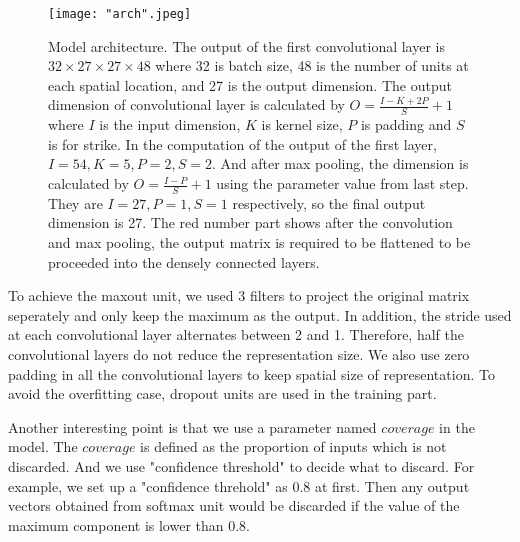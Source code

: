 \documentclass[conference]{IEEEtran}
\begin{document}
\begin{figure}[h]
\centering
\texttt{[image: "arch".jpeg]}
\caption{Model architecture. The output of the first convolutional layer is $32\times27\times27\times48$ where 32 is batch size, 48 is the number of units at each spatial location, and 27 is the output dimension. The output dimension of convolutional layer is calculated by $O=\frac{I-K+2P}{S}+1$ where $I$ is the input dimension, $K$ is kernel size, $P$ is padding and $S$ is for strike. In the computation of the output of the first layer, $I=54, K=5, P=2, S=2$. And after max pooling, the dimension is calculated by $O=\frac{I-P}{S}+1$ using the parameter value from last step. They are $I=27, P=1, S=1$ respectively, so the final output dimension is 27. The red number part shows after the convolution and max pooling, the output matrix is required to be flattened to be proceeded into the densely connected layers.   }

\label{fig1}
\end{figure}
To achieve the maxout unit, we used 3 filters to project the original matrix seperately and only keep the maximum as the output. In addition, the stride used at each convolutional layer alternates between 2 and 1. Therefore, half the convolutional layers do not reduce the representation size. We also use zero padding in all the convolutional layers to keep spatial size of representation. To avoid the overfitting case, dropout units are used in the training part.

Another interesting point is that we use a parameter named $coverage$ in the model. The $coverage$ is defined as the proportion of inputs which is not discarded\cite{street}. And we use "confidence threshold" to decide what to discard. For example, we set up a "confidence threhold" as 0.8 at first. Then any output vectors obtained from softmax unit would be discarded if the value of the maximum component is lower than 0.8.
\end{document}
